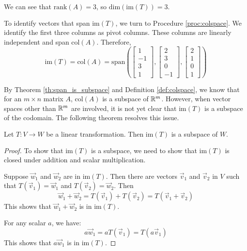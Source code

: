 \documentclass{ximera}
\begin{document}
\begin{example}
\begin{explanation}
We can see that $\mbox{rank}(A)=3$, so $\mbox{dim}(\mbox{im}(T))=3$.  

To identify vectors that span $\mbox{im}(T)$, we turn to Procedure \ref{proc:colspace}.  We identify the first three columns as pivot columns.  These columns are linearly independent and span $\mbox{col}(A)$.  Therefore,
$$\mbox{im}(T)=\mbox{col}(A)=\mbox{span}\left(\begin{bmatrix}1\\-1\\3\\1\end{bmatrix}, \begin{bmatrix}2\\3\\0\\-1\end{bmatrix}, \begin{bmatrix}2\\1\\0\\1\end{bmatrix}\right)$$
\end{explanation}
\end{example}

By Theorem \ref{th:span_is_subspace} and Definition \ref{def:colspace}, we know that for an $m\times n$ matrix $A$, $\mbox{col}(A)$ is a subspace of $\mathbb{R}^m$.  However, when vector spaces other than $\mathbb{R}^m$ are involved, it is not yet clear that $\mbox{im}(T)$ is a subspace of the codomain. The following theorem resolves this issue.

\begin{theorem}\label{th:imagesubspace}
Let $T:V\rightarrow W$ be a linear transformation.  Then $\mbox{im}(T)$ is a subspace of $W$.
\end{theorem}
\begin{proof}
To show that $\mbox{im}(T)$ is a subspace, we need to show that $\mbox{im}(T)$ is closed under addition and scalar multiplication.

Suppose $\vec{w}_1$ and $\vec{w}_2$ are in $\mbox{im}(T)$.  Then there are vectors $\vec{v}_1$ and $\vec{v}_2$ in $V$ such that $T(\vec{v}_1)=\vec{w}_1$ and $T(\vec{v}_2)=\vec{w}_2$.  Then
$$\vec{w}_1+\vec{w}_2=T(\vec{v}_1)+T(\vec{v}_2)=T(\vec{v}_1+\vec{v}_2)$$
This shows that $\vec{w}_1+\vec{w}_2$ is in $\mbox{im}(T)$.

For any scalar $a$, we have:
$$a\vec{w}_1=aT(\vec{v}_1)=T(a\vec{v}_1)$$
This shows that $a\vec{w}_1$ is in $\mbox{im}(T)$.

\end{proof}
\end{document}
